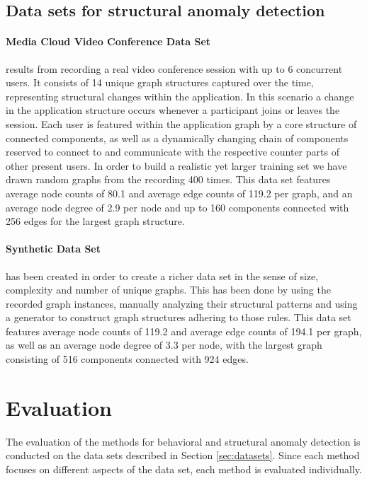 \documentclass{llncs}
\begin{document}
\subsection{Data sets for structural anomaly detection}
\label{sec:datasets_structural}

\paragraph{Media Cloud Video Conference Data Set}
results from recording a real video conference session with up to 6 concurrent users. It consists of 14 unique graph structures captured over the time, representing structural changes within the application. In this scenario a change in the application structure occurs whenever a participant joins or leaves the session. Each user is featured within the application graph by a core structure of connected components, as well as a dynamically changing chain of components reserved to connect to and communicate with the respective counter parts of other present users. In order to build a realistic yet larger training set we have drawn random graphs from the recording 400 times. 
This data set features average node counts of 80.1 and average edge counts of 119.2 per graph, and an average node degree of 2.9 per node and up to 160 components connected with 256 edges for the largest graph structure.

\paragraph{Synthetic Data Set}
has been created in order to create a richer data set in the sense of size, complexity and number of unique graphs. This has been done by using the recorded graph instances, manually analyzing their structural patterns and using a generator to construct graph structures adhering to those rules. This data set features average node counts of 119.2 and average edge counts of 194.1 per graph, as well as an average node degree of 3.3 per node, with the largest graph consisting of 516 components connected with 924 edges.
 

%
 \section{Evaluation}
\label{sec:evaluation}
The evaluation of the methods for behavioral and structural anomaly detection is conducted on the data sets described in Section \ref{sec:datasets}. Since each method focuses on different aspects of the data set, each method is evaluated individually.
\end{document}
